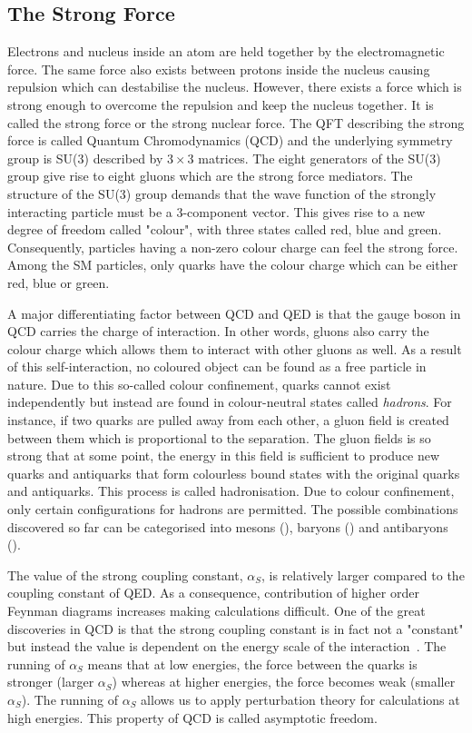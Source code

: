 \subsection{The Strong Force}
Electrons and nucleus inside an atom are held together by the electromagnetic force. The same 
force also exists between protons inside the nucleus causing repulsion which can destabilise the 
nucleus. However, there exists a force
which is strong enough to overcome the repulsion and keep the nucleus together. It is called the strong force or 
the strong nuclear force. The QFT describing the strong force is called Quantum Chromodynamics (QCD) and the
underlying symmetry group is SU(3) described by $3 \times 3$ matrices. The eight generators of the SU(3) group
give rise to eight gluons which are the strong force mediators. The structure of the SU(3) group demands that 
the wave function of the strongly interacting particle must be a 3-component vector. This gives rise to 
a new degree of freedom called "colour", with three states called red, blue and green. Consequently, particles
having a non-zero colour charge can feel the strong force. Among the SM particles, only quarks have the colour
charge which can be either red, blue or green.

A major differentiating factor between QCD and QED is that the gauge boson in QCD carries the charge of 
interaction. In other words, gluons also carry the colour charge which allows them to interact with other 
gluons as well. As a result of this self-interaction, no coloured object can be found as a free particle in 
nature. Due to this so-called colour confinement, quarks cannot exist independently but instead are found in
colour-neutral states called \textit{hadrons}. For instance, if two quarks are pulled away from each other, a gluon field is 
created between them which is proportional to the separation. The gluon fields is so strong that at some point,
the energy in this field is sufficient to produce new quarks and antiquarks that form colourless bound states
with the original quarks and antiquarks.
This process is called hadronisation. Due to colour confinement, only certain configurations for hadrons
are permitted. The possible combinations discovered so far can be categorised into mesons (\Pquark{}\APquark),
baryons (\Pquark{}\Pquark{}\Pquark) and antibaryons (\APquark{}\APquark{}\APquark).

The value of the strong coupling constant, $\alpha_S$, is relatively larger compared to the coupling 
constant of QED. As a consequence, contribution of higher order Feynman diagrams
increases making calculations difficult. One of the
great discoveries in QCD is that the strong coupling constant is in fact not a "constant" but instead the
value is dependent on the energy scale of the interaction~\cite{Deur:2016tte}. The running of $\alpha_S$ means that at low
energies, the force between the quarks is stronger (larger $\alpha_S$) whereas at higher energies, the 
force becomes weak (smaller $\alpha_S$). The running of $\alpha_S$ allows us to apply 
perturbation theory for calculations
at high energies. This property of QCD is called asymptotic freedom. 

